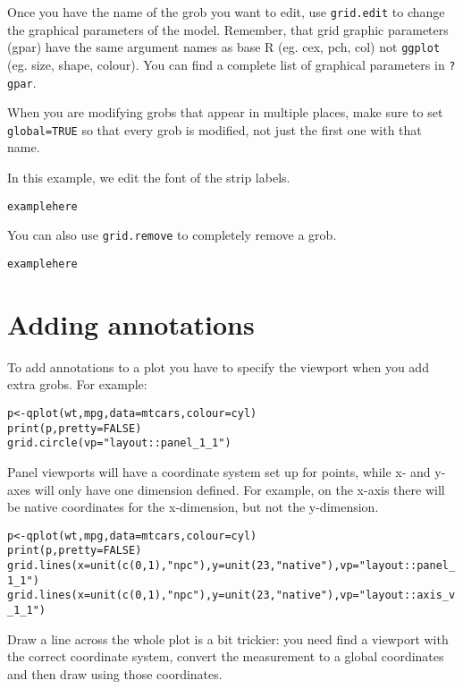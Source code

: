 Once you have the name of the grob you want to edit, use  {\tt grid.edit} to change the graphical parameters of the model.  Remember, that grid graphic parameters (gpar) have the same argument names as base R (eg. cex, pch, col) not {\tt ggplot} (eg. size, shape, colour).  You can find a complete list of graphical parameters in {\tt ?gpar}.

When you are modifying grobs that appear in multiple places, make sure to set {\tt global=TRUE} so that every grob is modified, not just the first one with that name.

In this example, we edit the font of the strip labels.

\begin{alltt}
example here
\end{alltt}

You can also use {\tt grid.remove} to completely remove a grob.

\begin{alltt}
example here
\end{alltt}

\section{Adding annotations}\label{sec:adding_annotation}

To add annotations to a plot you have to specify the viewport when you add extra grobs.  For example:

\begin{alltt}
p <- qplot(wt, mpg, data=mtcars, colour=cyl)
print(p, pretty=FALSE)
grid.circle(vp="layout::panel_1_1")
\end{alltt}

Panel viewports will have a coordinate system set up for points, while x- and y- axes will only have one dimension defined.  For example, on the x-axis there will be native coordinates for the x-dimension, but not the y-dimension.

\begin{alltt}
p <- qplot(wt, mpg, data=mtcars, colour=cyl)
print(p, pretty=FALSE)
grid.lines(x=unit(c(0,1), "npc"), y=unit(23, "native"), vp="layout::panel_1_1")
grid.lines(x=unit(c(0,1), "npc"), y=unit(23, "native"), vp="layout::axis_v_1_1")
\end{alltt}

Draw a line across the whole plot is a bit trickier: you need find a viewport with the correct coordinate system, convert the measurement to a global coordinates and then draw using those coordinates.

